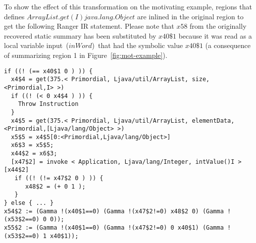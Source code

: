 %
To show the effect of this transformation on the motivating example, regions that defines
$ArrayList.get(I)java.lang.Object$ are inlined in the original region to get the following Ranger IR statement.
%
Please note that $x58$ from the originally recovered static summary has been substituted by $x40\$1$ because it was
read as a local variable input~($inWord$)~that had the symbolic value $x40\$1$ (a consequence of summarizing region 1 in
Figure~\ref{fig:mot-example}).
%
\begin{lstlisting}
if ((! (== x40$1 0 ) )) {
  x4$4 = get(375.< Primordial, Ljava/util/ArrayList, size, <Primordial,I> >)
  if ((! (< 0 x4$4 ) )) {
    Throw Instruction
  }
  x4$5 = get(375.< Primordial, Ljava/util/ArrayList, elementData, <Primordial,[Ljava/lang/Object> >)
  x5$5 = x4$5[0:<Primordial,Ljava/lang/Object>]
  x6$3 = x5$5;
  x44$2 = x6$3;
  [x47$2] = invoke < Application, Ljava/lang/Integer, intValue()I >[x44$2]
   if ((! (!= x47$2 0 ) )) {
      x48$2 = (+ 0 1 );
   }
} else { ... }
x54$2 := (Gamma !(x40$1==0) (Gamma !(x47$2!=0) x48$2 0) (Gamma !(x53$2==0) 0 0));
x55$2 := (Gamma !(x40$1==0) (Gamma !(x47$2!=0) 0 x40$1) (Gamma !(x53$2==0) 1 x40$1));
\end{lstlisting}
 
